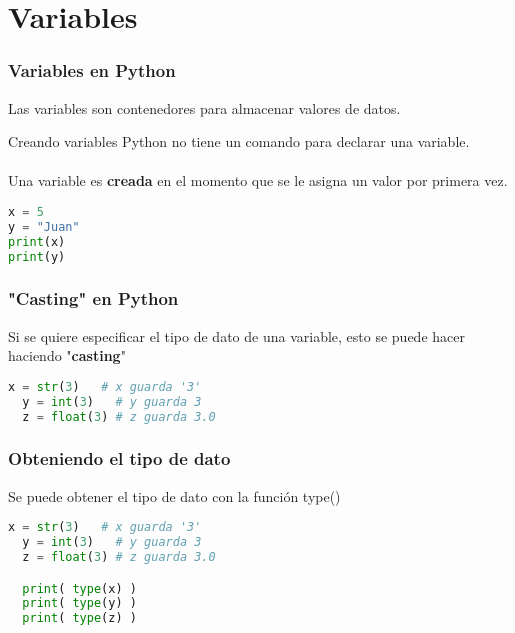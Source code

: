 \section{Variables}

\begin{frame}[fragile]
  \frametitle{Variables en Python}

  Las variables son contenedores para almacenar valores de datos.

  \begin{block}{Creando variables}
    Python no tiene un comando para declarar una variable. \\~\\
    Una variable es \textbf{creada} en el momento que se le asigna un
    valor por primera vez.
  \end{block}

  \begin{lstlisting}[language=Python]
x = 5
y = "Juan"
print(x)
print(y)
  \end{lstlisting}
\end{frame}

\begin{frame}[fragile]
  \frametitle{"Casting" en Python}

  Si se quiere especificar el tipo de dato de una variable, esto se puede hacer
  haciendo "\textbf{casting}"

  \vspace{\baselineskip}
  \begin{lstlisting}[language=Python]
  x = str(3)   # x guarda '3'
  y = int(3)   # y guarda 3
  z = float(3) # z guarda 3.0
  \end{lstlisting}
\end{frame}

\begin{frame}[fragile]
  \frametitle{Obteniendo el tipo de dato}

  Se puede obtener el tipo de dato con la función
  \textcolor{codeKeyword2}{type}()

  \vspace{\baselineskip}
  \begin{lstlisting}[language=Python]
  x = str(3)   # x guarda '3'
  y = int(3)   # y guarda 3
  z = float(3) # z guarda 3.0

  print( type(x) )
  print( type(y) )
  print( type(z) )
  \end{lstlisting}
\end{frame}

